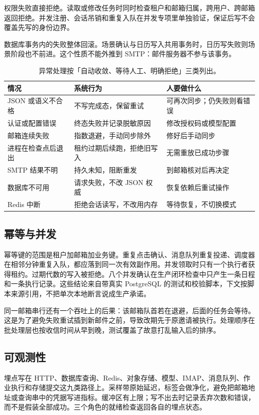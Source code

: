 \documentclass[UTF8,a4paper,zihao=5,fontset=fandol]{ctexart}
\begin{document}
权限失败直接拒绝。读取或修改任务时同时检查租户和邮箱归属，跨用户、跨邮箱返回拒绝。并发注册、会话吊销和重复入队在并发专项里单独验证，保证后写不会覆盖先写的身份边界。

数据库事务内的失败整体回滚。场景确认与日历写入共用事务时，日历写失败则场景阶段也不前进。这个性质不能外推到 SMTP：邮件服务器不参与该事务。

\begin{table}[ht]
\centering
\small
\begin{tabularx}{\textwidth}{@{}p{32mm}YY@{}}
\toprule
\textbf{情况} & \textbf{系统行为} & \textbf{人要做什么}\\
\midrule
JSON 或语义不合格 & 不写完成态，保留重试 & 可再次同步；仍失败则看错误\\
认证或配置错误 & 终态失败并记录脱敏原因 & 修改授权码或模型配置\\
邮箱连续失败 & 指数退避，手动同步除外 & 修好后手动同步\\
进程在检查点后退出 & 租约过期后续跑，拒绝旧写入 & 无需重放已成功步骤\\
SMTP 结果不明 & 持久未知，阻断重发 & 到邮箱核对后再决定\\
数据库不可用 & 请求失败，不改 JSON 权威 & 恢复依赖后重试操作\\
Redis 中断 & 拒绝会话读写，不改用内存 & 等待恢复，不切换模式\\
\bottomrule
\end{tabularx}
\caption{异常处理按「自动收敛、等待人工、明确拒绝」三类列出。}
\end{table}

\subsection{幂等与并发}
幂等键的范围是租户加邮箱加业务键。重复点击确认、消息队列重复投递、调度器在相邻分钟重复入队，都应落到同一次有效副作用。并发领取时只有一个执行者获得租约。过期代数的写入被拒绝。八个并发确认在生产闭环检查中只产生一条日程和一条执行记录。这些结论来自带真实 PostgreSQL 的测试和校验脚本，下文按脚本来源引用，不把单次本地断言说成生产承诺。

同一邮箱串行还有一个吞吐上的后果：该邮箱队首若在退避，后面的任务会等待。这是为了避免失败重试插到新邮件之前，导致改期先于原邀请被执行。处理顺序在批处理层也按收信时间从早到晚，测试覆盖了故意打乱输入后的排序。

\subsection{可观测性}
埋点写在 HTTP、数据库查询、Redis、对象存储、模型、IMAP、消息队列、作业执行和存储提交这九类路径上。采样带原始延迟，标签会做净化，避免把邮箱地址或查询串中的凭据写进指标。缓冲区有上限；写不出去时记录丢弃次数和错误，而不是假装全部成功。三个角色的就绪检查返回各自的埋点状态。
\end{document}

